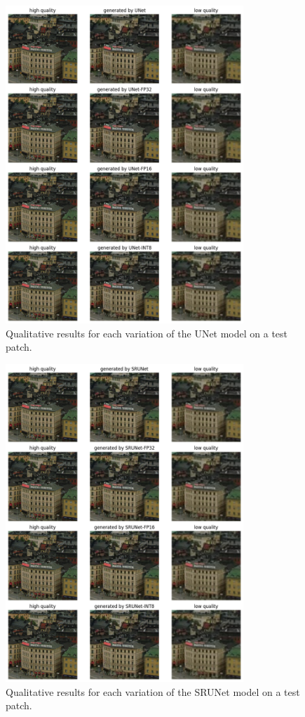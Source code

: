\begin{figure}[ht]
\includegraphics[width=0.8\textwidth]{static/01_unet_qualitative_results.png}
\caption{Qualitative results for each variation of the UNet model on a test patch.}
\label{fig:building-qualitative-unet}
\end{figure}

\begin{figure}[ht]
\includegraphics[width=0.8\textwidth]{static/01_srunet_qualitative_results.png}
\caption{Qualitative results for each variation of the SRUNet model on a test patch.}
\label{fig:building-qualitative-srunet}
\end{figure}

